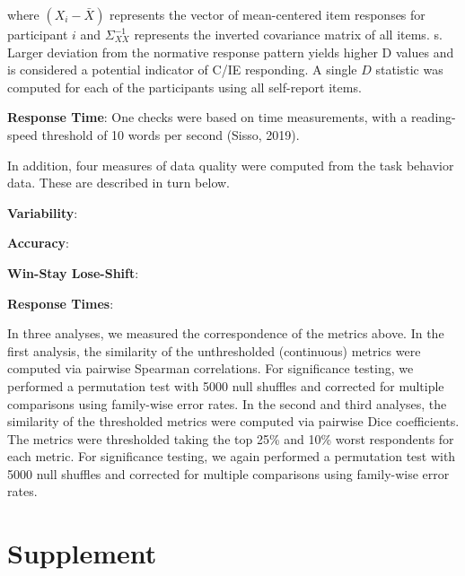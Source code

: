 \documentclass[a4paper,notitlepage,12pt]{article}
\begin{document}
where $(X_i - \bar{X})$ represents the vector of mean-centered item responses for participant $i$ and $\Sigma^{-1}_{XX}$ represents the inverted covariance matrix of all items. s. Larger deviation from the normative response pattern yields higher D values and is considered a potential indicator of C/IE responding. A single $D$ statistic was computed for each of the participants using all self-report items.

\textbf{Response Time}: One checks were based on time measurements, with a reading-speed threshold of 10 words per second (Sisso, 2019).

In addition, four measures of data quality were computed from the task behavior data. These are described in turn below.

\textbf{Variability}: 

\textbf{Accuracy}: 

\textbf{Win-Stay Lose-Shift}: 

\textbf{Response Times}:

In three analyses, we measured the correspondence of the metrics above. In the first analysis, the similarity of the unthresholded (continuous) metrics were computed via pairwise Spearman correlations. For significance testing, we performed a permutation test with 5000 null shuffles and corrected for multiple comparisons using family-wise error rates. In the second and third analyses, the similarity of the thresholded metrics were computed via pairwise Dice coefficients. The metrics were thresholded taking the top 25\% and 10\% worst respondents for each metric. For significance testing, we again performed a permutation test with 5000 null shuffles and corrected for multiple comparisons using family-wise error rates.

\pagebreak
\section{Supplement}
\end{document}
